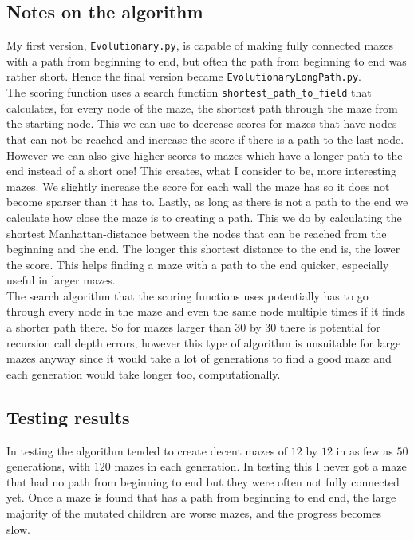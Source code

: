 \documentclass[10pt, a4paper, twoside]{amsart}
\newcommand{\1}{\mathbbm{1}}
\begin{document}
\subsection{Notes on the algorithm}
My first version, \verb+Evolutionary.py+, is capable of making fully connected mazes with a path from beginning to end, but often the path from beginning to end was rather short. Hence the final version became \verb+EvolutionaryLongPath.py+.\\

The scoring function uses a search function \verb+shortest_path_to_field+ that calculates, for every node of the maze, the shortest path through the maze from the starting node. This we can use to decrease scores for mazes that have nodes that can not be reached and increase the score if there is a path to the last node. However we can also give higher scores to mazes which have a longer path to the end instead of a short one! This creates, what I consider to be, more interesting mazes. We slightly increase the score for each wall the maze has so it does not become sparser than it has to. Lastly, as long as there is not a path to the end we calculate how close the maze is to creating a path. This we do by calculating the shortest Manhattan-distance between the nodes that can be reached from the beginning and the end. The longer this shortest distance to the end is, the lower the score. This helps finding a maze with a path to the end quicker, especially useful in larger mazes.\\

The search algorithm that the scoring functions uses potentially has to go through every node in the maze and even the same node multiple times if it finds a shorter path there. So for mazes larger than $30$ by $30$ there is potential for recursion call depth errors, however this type of algorithm is unsuitable for large mazes anyway since it would take a lot of generations to find a good maze and each generation would take longer too, computationally.\\


\subsection{Testing results}
In testing the algorithm tended to create decent mazes of $12$ by $12$ in as few as $50$ generations, with $120$ mazes in each generation. In testing this I never got a maze that had no path from beginning to end but they were often not fully connected yet. Once a maze is found that has a path from beginning to end end, the large majority of the mutated children are worse mazes, and the progress becomes slow.\\
\end{document}
